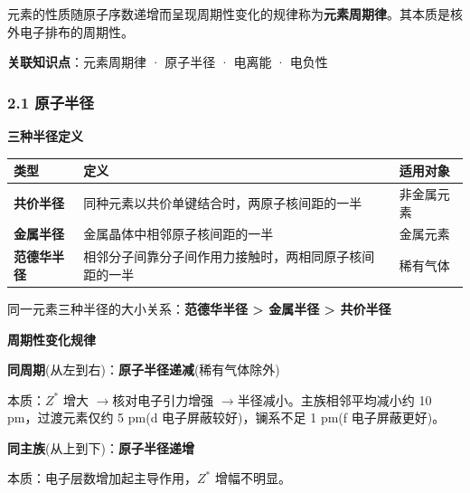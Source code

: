 \documentclass[a4paper,11pt]{ctexart}
\newcounter{none}
\newcommand{\箭}{\ensuremath{\rightarrow}}
\newcommand{\左箭}{\ensuremath{\leftarrow}}
\newcommand{\上箭}{\ensuremath{\uparrow}}
\newcommand{\下箭}{\ensuremath{\downarrow}}
\newcommand{\衡}{\ensuremath{\rightleftharpoons}}
\newcommand{\双箭}{\ensuremath{\leftrightarrow}}
\newcommand{\约等于}{\ensuremath{\approx}}
\newcommand{\小于等于}{\ensuremath{\leq}}
\newcommand{\大于等于}{\ensuremath{\geq}}
\newcommand{\不等于}{\ensuremath{\neq}}
\newcommand{\西格马}{\ensuremath{\sigma}}
\newcommand{\派}{\ensuremath{\pi}}
\begin{document}
元素的性质随原子序数递增而呈现周期性变化的规律称为\textbf{元素周期律}。其本质是核外电子排布的周期性。

\textbf{关联知识点}：元素周期律 · 原子半径 · 电离能 · 电负性

\subsubsection{2.1 原子半径}\label{ux539fux5b50ux534aux5f84}

\textbf{三种半径定义}

{\def\LTcaptype{none} %
\begin{longtable}[]{@{}
  >{\raggedright\arraybackslash}p{}
  >{\raggedright\arraybackslash}p{}
  >{\raggedright\arraybackslash}p{}@{}}
\toprule\noalign{}
\begin{minipage}[b]{\linewidth}\raggedright
类型
\end{minipage} & \begin{minipage}[b]{\linewidth}\raggedright
定义
\end{minipage} & \begin{minipage}[b]{\linewidth}\raggedright
适用对象
\end{minipage} \\
\midrule\noalign{}
\endhead
\bottomrule\noalign{}
\endlastfoot
\textbf{共价半径} & 同种元素以共价单键结合时，两原子核间距的一半 & 非金属元素 \\
\textbf{金属半径} & 金属晶体中相邻原子核间距的一半 & 金属元素 \\
\textbf{范德华半径} & 相邻分子间靠分子间作用力接触时，两相同原子核间距的一半 & 稀有气体 \\
\end{longtable}
}

同一元素三种半径的大小关系：\textbf{范德华半径 \textgreater{} 金属半径 \textgreater{} 共价半径}

\textbf{周期性变化规律}

\textbf{同周期}(从左到右)：\textbf{原子半径递减}(稀有气体除外)

本质：\(Z^*\) 增大 \箭 核对电子引力增强 \箭 半径减小。主族相邻平均减小约 10 pm，过渡元素仅约 5 pm(d 电子屏蔽较好)，镧系不足 1 pm(f 电子屏蔽更好)。

\textbf{同主族}(从上到下)：\textbf{原子半径递增}

本质：电子层数增加起主导作用，\(Z^*\) 增幅不明显。
\end{document}
